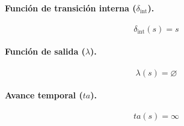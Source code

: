 \paragraph{Función de transición interna ($\delta_{\mathrm{int}}$).}
\[
  \delta_{\mathrm{int}}(s) = s
\]

\paragraph{Función de salida ($\lambda$).}
\[
  \lambda(s) = \varnothing
\]

\paragraph{Avance temporal ($ta$).}
\[
  ta(s) = \infty
\]